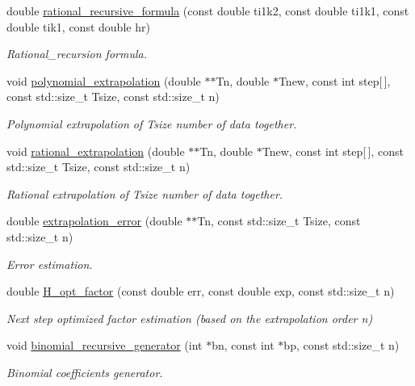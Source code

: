 \begin{DoxyCompactItemize}
double \hyperlink{namespaceEP_afe6d08bb36343e39ebbbd4406dc9989f}{rational\+\_\+recursive\+\_\+formula} (const double ti1k2, const double ti1k1, const double tik1, const double hr)
\begin{DoxyCompactList}\small\item\em Rational\+\_\+recursion formula. \end{DoxyCompactList}\item 
void \hyperlink{namespaceEP_ae89d6690a891336eef708e90e575a2be}{polynomial\+\_\+extrapolation} (double $\ast$$\ast$Tn, double $\ast$Tnew, const int step\mbox{[}$\,$\mbox{]}, const std\+::size\+\_\+t Tsize, const std\+::size\+\_\+t n)
\begin{DoxyCompactList}\small\item\em Polynomial extrapolation of Tsize number of data together. \end{DoxyCompactList}\item 
void \hyperlink{namespaceEP_a069470acd4f6c52b2ebb68afcf4528ab}{rational\+\_\+extrapolation} (double $\ast$$\ast$Tn, double $\ast$Tnew, const int step\mbox{[}$\,$\mbox{]}, const std\+::size\+\_\+t Tsize, const std\+::size\+\_\+t n)
\begin{DoxyCompactList}\small\item\em Rational extrapolation of Tsize number of data together. \end{DoxyCompactList}\item 
double \hyperlink{namespaceEP_ab0499a8ae6cab209fc0cca6a47b166f3}{extrapolation\+\_\+error} (double $\ast$$\ast$Tn, const std\+::size\+\_\+t Tsize, const std\+::size\+\_\+t n)
\begin{DoxyCompactList}\small\item\em Error estimation. \end{DoxyCompactList}\item 
double \hyperlink{namespaceEP_ac820e20bad3526991885e767a4e11097}{H\+\_\+opt\+\_\+factor} (const double err, const double exp, const std\+::size\+\_\+t n)
\begin{DoxyCompactList}\small\item\em Next step optimized factor estimation (based on the extrapolation order n) \end{DoxyCompactList}\item 
void \hyperlink{namespaceEP_a92c709f3757c872402d2fcf954c3e2de}{binomial\+\_\+recursive\+\_\+generator} (int $\ast$bn, const int $\ast$bp, const std\+::size\+\_\+t n)
\begin{DoxyCompactList}\small\item\em Binomial coefficients generator. \end{DoxyCompactList}\item 
$$
\end{DoxyCompactItemize}
